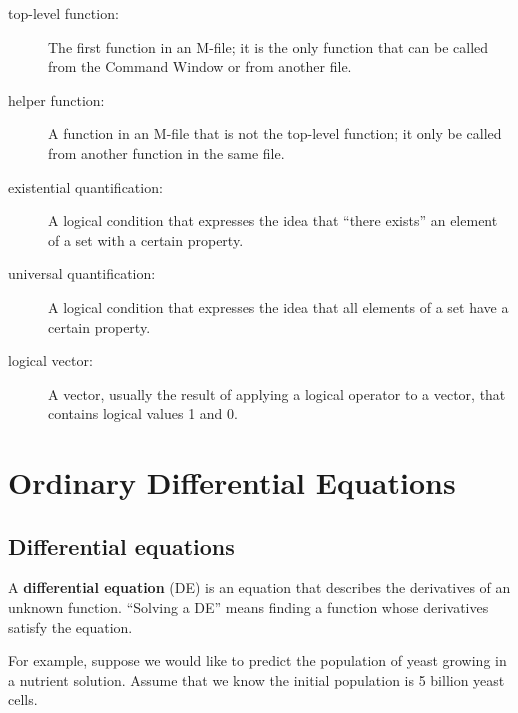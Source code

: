 \documentclass[
]{book}
\numberwithin{Answer}{chapter}
\numberwithin{Exercise}{chapter}
\begin{document}
\begin{description}

\item[top-level function:]  The first function in an M-file;
it is the only function that can be called from the Command
Window or from another file.

\item[helper function:] A function in an M-file that is not
the top-level function; it only be called from another function
in the same file.

\item[existential quantification:] A logical condition that expresses
the idea that ``there exists'' an element of a set with a certain
property.

\item[universal quantification:] A logical condition that expresses
the idea that all elements of a set have a certain property.

\item[logical vector:] A vector, usually the result of applying a logical
operator to a vector, that contains logical values 1 and 0.


\end{description}





\chapter{Ordinary Differential Equations}


\section{Differential equations}
\label{diffeq}

A {\bf differential equation} (DE) is an equation that describes the
derivatives of an unknown function.  ``Solving a DE'' means finding a
function whose derivatives satisfy the equation.


For example, suppose we would like to predict the population of yeast growing in a nutrient solution.  Assume that we know the initial population is 5 billion yeast cells.
\end{document}
